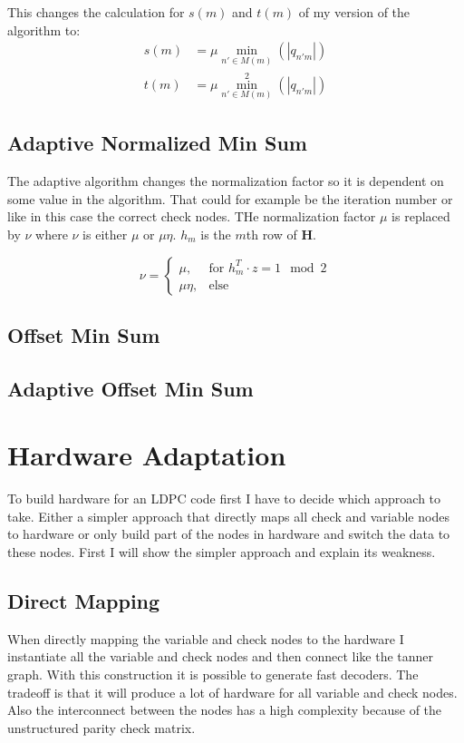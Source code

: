 This changes the calculation for $s(m)$ and $t(m)$ of my version of the algorithm to:
\begin{align}
    s(m) & = \mu \min_{n' \in M(m)}(\left|q_{n'm}\right|) \label{cn_min}\\
    t(m) & = \mu \min_{n' \in M(m)}^2(\left|q_{n'm}\right|) \label{cn_min2}
\end{align}

\subsection{Adaptive Normalized Min Sum}
The adaptive algorithm changes the normalization factor so it is dependent on some value in the algorithm. That could for example be the iteration number or like in this case the correct check nodes. THe normalization factor $\mu$ is replaced by $\nu$ where $\nu$ is either $\mu$ or $\mu \eta$. $h_m$ is the $m$th row of $\bm{H}$.


\begin{equation}
    \nu = \begin{cases}
        \mu, & \text{for } h^T_m \cdot z = 1 \mod 2 \\
        \mu \eta, & \text{else}
    \end{cases}
\end{equation}

\subsection{Offset Min Sum}

\subsection{Adaptive Offset Min Sum}

\section{Hardware Adaptation}
To build hardware for an LDPC code first I have to decide which approach to take. Either a simpler approach that directly maps all check and variable nodes to hardware or only build part of the nodes in hardware and switch the data to these nodes. First I will show the simpler approach and explain its weakness.

\subsection{Direct Mapping}
When directly mapping the variable and check nodes to the hardware I instantiate all the variable and check nodes and then connect like the tanner graph. With this construction it is possible to generate fast decoders. The tradeoff is that it will produce a lot of hardware for all variable and check nodes. Also the interconnect between the nodes has a high complexity because of the unstructured parity check matrix.

